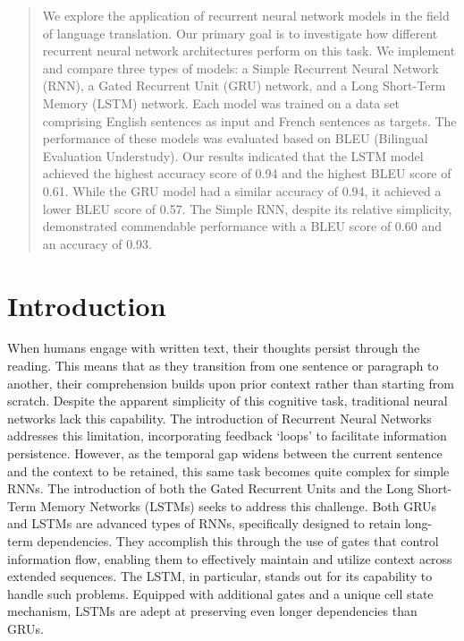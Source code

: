 \documentclass{article}
\begin{document}

\begin{abstract}
We explore the application of recurrent neural network models in the field of language translation. Our primary goal is to investigate how different recurrent neural network architectures perform on this task. We implement and compare three types of models: a Simple Recurrent Neural Network (RNN), a Gated Recurrent Unit (GRU) network, and a Long Short-Term Memory (LSTM) network. Each model was trained on a data set comprising English sentences as input and French sentences as targets. The performance of these models was evaluated based on BLEU (Bilingual Evaluation Understudy). Our results indicated that the LSTM model achieved the highest accuracy score of 0.94 and the highest BLEU score of 0.61. While the GRU model had a similar accuracy of 0.94, it achieved a lower BLEU score of 0.57. The Simple RNN, despite its relative simplicity, demonstrated commendable performance with a BLEU score of 0.60 and an accuracy of 0.93. 

\end{abstract}

\section{Introduction}
\label{introduction}

When humans engage with written text, their thoughts persist through the reading. This means that as they transition from one sentence or paragraph to another, their comprehension builds upon prior context rather than starting from scratch. Despite the apparent simplicity of this cognitive task, traditional neural networks lack this capability. The introduction of Recurrent Neural Networks addresses this limitation, incorporating feedback `loops' to facilitate information persistence. However, as the temporal gap widens between the current sentence and the context to be retained, this same task becomes quite
complex for simple RNNs. The introduction of both the  Gated Recurrent Units and the Long Short-Term Memory Networks (LSTMs) seeks to address this challenge.
Both GRUs and LSTMs are advanced types of RNNs, specifically designed to retain long-term dependencies. 
They accomplish this through the use of gates that control 
information flow, enabling them to effectively maintain and
utilize context across extended sequences. The LSTM, in particular, stands out for its capability to handle such problems. Equipped with additional gates and a unique cell state mechanism, LSTMs are adept at preserving even longer dependencies than GRUs. 
\end{document}
